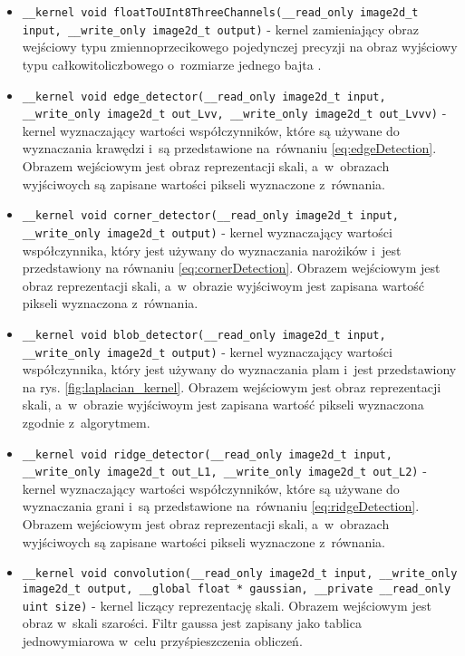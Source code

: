 \begin{itemize}
\item 
\texttt{\_\_kernel void  floatToUInt8ThreeChannels(\_\_read\_only image2d\_t input, \_\_write\_only image2d\_t output)} - kernel zamieniający obraz wejściowy typu zmiennoprzecikowego pojedynczej precyzji na obraz wyjściowy typu całkowitoliczbowego o~rozmiarze jednego bajta .

\item 
\texttt{\_\_kernel void  edge\_detector(\_\_read\_only image2d\_t input, \_\_write\_only image2d\_t out\_Lvv, \_\_write\_only image2d\_t out\_Lvvv)} - kernel wyznaczający wartości współczynników, które są używane do wyznaczania krawędzi i~są przedstawione na~równaniu \eqref{eq:edgeDetection}. Obrazem wejściowym jest obraz reprezentacji skali, a~w~obrazach wyjściwoych są zapisane wartości pikseli wyznaczone z~równania.

\item 
\texttt{\_\_kernel void  corner\_detector(\_\_read\_only image2d\_t input, \_\_write\_only image2d\_t output)} - kernel wyznaczający wartości współczynnika, który jest używany do wyznaczania narożików i~jest przedstawiony na równaniu \eqref{eq:cornerDetection}. Obrazem wejściowym jest obraz reprezentacji skali, a~w~obrazie wyjściwoym jest zapisana wartość pikseli wyznaczona z~równania.

\item 
\texttt{\_\_kernel void  blob\_detector(\_\_read\_only image2d\_t input, \_\_write\_only image2d\_t output)} - kernel wyznaczający wartości współczynnika, który jest używany do wyznaczania plam i~jest przedstawiony na rys. \ref{fig:laplacian_kernel}. Obrazem wejściowym jest obraz reprezentacji skali, a~w~obrazie wyjściwoym jest zapisana wartość pikseli wyznaczona zgodnie z~algorytmem.

\item 
\texttt{\_\_kernel void  ridge\_detector(\_\_read\_only image2d\_t input, \_\_write\_only image2d\_t out\_L1, \_\_write\_only image2d\_t out\_L2)} - kernel wyznaczający wartości współczynników, które są używane do wyznaczania grani i~są przedstawione na~równaniu \eqref{eq:ridgeDetection}. Obrazem wejściowym jest obraz reprezentacji skali, a~w~obrazach wyjściwoych są zapisane wartości pikseli wyznaczone z~równania.

\item 
\texttt{\_\_kernel void  convolution(\_\_read\_only image2d\_t input, \_\_write\_only image2d\_t output, \_\_global float * gaussian, \_\_private \_\_read\_only uint size)} - kernel liczący reprezentację skali. Obrazem wejściowym jest obraz w~skali szarości. Filtr gaussa jest zapisany jako tablica jednowymiarowa w~celu przyśpieszczenia obliczeń.

\end{itemize}
